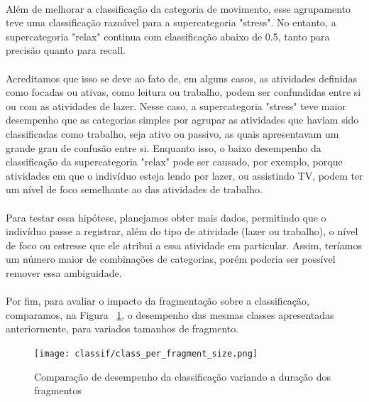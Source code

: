             \paragraph{} Além de melhorar a classificação da categoria de movimento, esse agrupamento teve uma classificação razoável para a supercategoria "stress". No entanto, a supercategoria "relax" continua com classificação abaixo de 0.5, tanto para precisão quanto para recall. 
            \paragraph{} Acreditamos que isso se deve ao fato de, em alguns casos, as atividades definidas como focadas ou ativas, como leitura ou trabalho, podem ser confundidas entre si ou com as atividades de lazer. Nesse caso, a supercategoria "stress" teve maior desempenho que as categorias simples por agrupar as atividades que haviam sido classificadas como trabalho, seja ativo ou passivo, as quais apresentavam um grande grau de confusão entre si. Enquanto isso, o baixo desempenho da classificação da supercategoria "relax" pode ser causado, por exemplo, porque atividades em que o indivíduo esteja lendo por lazer, ou assistindo TV, podem ter um nível de foco semelhante ao das atividades de trabalho.
            \paragraph{} Para testar essa hipótese, planejamos obter mais dados, permitindo que o indivíduo passe a registrar, além do tipo de atividade (lazer ou trabalho), o nível de foco ou estresse que ele atribui a essa atividade em particular. Assim, teríamos um número maior de combinações de categorias, porém poderia ser possível remover essa ambiguidade.
            
            \paragraph{} Por fim, para avaliar o impacto da fragmentação sobre a classificação, comparamos, na Figura ~\ref{class_per_fragment}, o desempenho das mesmas classes apresentadas anteriormente, para variados tamanhos de fragmento.
            
            \begin{figure}[h!]
            	\centering
            	\texttt{[image: classif/class\_per\_fragment\_size.png]}
            	\caption{Comparação de desempenho da classificação variando a duração dos fragmentos}
                \label{class_per_fragment}
            \end{figure}            
            
